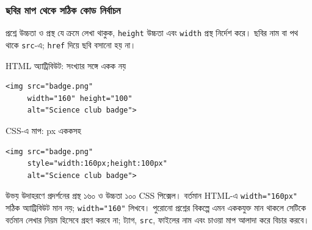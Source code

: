 \subsubsection{ছবির মাপ থেকে সঠিক কোড নির্বাচন}
প্রশ্নে উচ্চতা ও প্রস্থ যে ক্রমে লেখা থাকুক, \texttt{height} উচ্চতা এবং \texttt{width} প্রস্থ নির্দেশ করে। ছবির নাম বা পথ থাকে \texttt{src}-এ; \texttt{href} দিয়ে ছবি বসানো হয় না।

\par\noindent
\begin{minipage}[t]{.48\linewidth}\vspace{0pt}
\begin{chFourWholeExample}{HTML অ্যাট্রিবিউট: সংখ্যার সঙ্গে একক নয়}
\begin{verbatim}
<img src="badge.png"
     width="160" height="100"
     alt="Science club badge">
\end{verbatim}
\end{chFourWholeExample}
\end{minipage}\hfill
\begin{minipage}[t]{.48\linewidth}\vspace{0pt}
\begin{chFourWholeExample}{CSS-এ মাপ: px এককসহ}
\begin{verbatim}
<img src="badge.png"
     style="width:160px;height:100px"
     alt="Science club badge">
\end{verbatim}
\end{chFourWholeExample}
\end{minipage}\par
উভয় উদাহরণে প্রদর্শনের প্রস্থ ১৬০ ও উচ্চতা ১০০ CSS পিক্সেল। বর্তমান HTML-এ \texttt{width="160px"} সঠিক অ্যাট্রিবিউট মান নয়; \texttt{width="160"} লিখবে। পুরোনো প্রশ্নের বিকল্পে এমন এককযুক্ত মান থাকলে সেটিকে বর্তমান লেখার নিয়ম হিসেবে গ্রহণ করবে না; ট্যাগ, \texttt{src}, ফাইলের নাম এবং চাওয়া মাপ আলাদা করে বিচার করবে।

